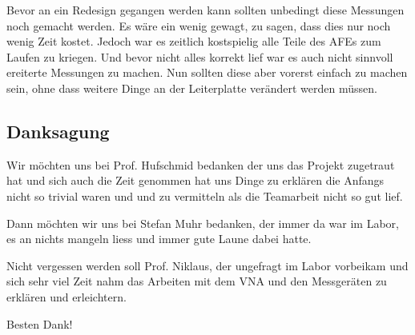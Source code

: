 Bevor an ein Redesign gegangen werden kann sollten unbedingt diese Messungen noch gemacht werden. Es wäre ein wenig gewagt, zu sagen, dass dies nur noch wenig Zeit kostet. Jedoch war es zeitlich kostspielig alle Teile des AFEs zum Laufen zu kriegen. Und bevor nicht alles korrekt lief war es auch nicht sinnvoll ereiterte Messungen zu machen. Nun sollten diese aber vorerst einfach zu machen sein, ohne dass weitere Dinge an der Leiterplatte verändert werden müssen.

\subsection*{Danksagung}

Wir möchten uns bei Prof. Hufschmid bedanken der uns das Projekt zugetraut hat und sich auch die Zeit genommen hat uns Dinge zu erklären die Anfangs nicht so trivial waren und und zu vermitteln als die Teamarbeit nicht so gut lief.

Dann möchten wir uns bei Stefan Muhr bedanken, der immer da war im Labor, es an nichts mangeln liess und immer gute Laune dabei hatte.

Nicht vergessen werden soll Prof. Niklaus, der ungefragt im Labor vorbeikam und sich sehr viel Zeit nahm das Arbeiten mit dem VNA und den Messgeräten zu erklären und erleichtern.

Besten Dank!